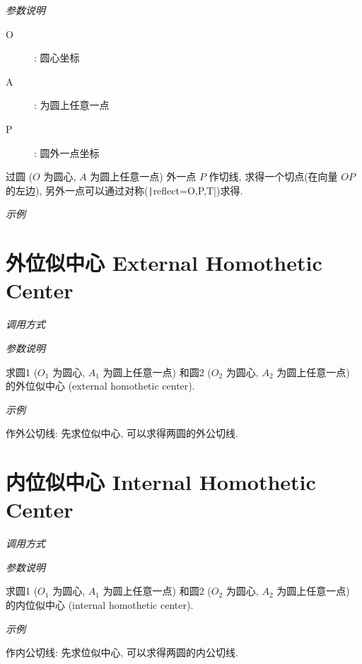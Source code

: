 \emph{参数说明}

\begin{description}
  \item[O]: 圆心坐标
  \item[A]: 为圆上任意一点
  \item[P]: 圆外一点坐标
\end{description}

过圆 ($O$ 为圆心, $A$ 为圆上任意一点) 外一点 $P$ 作切线, 求得一个切点(在向量 $OP$ 的左边),
另外一点可以通过对称(\texttt|reflect={O,P,T}|)求得.

\emph{示例}


\section{外位似中心 External Homothetic Center}

\emph{调用方式}

\begin{tcolorbox}{}
\end{tcolorbox}

\emph{参数说明}

求圆1 ($O_1$ 为圆心, $A_1$ 为圆上任意一点)
和圆2 ($O_2$ 为圆心, $A_2$ 为圆上任意一点) 
的外位似中心 (external homothetic center)\cite{HOMO}.

\emph{示例}

作外公切线: 先求位似中心, 可以求得两圆的外公切线.


\section{内位似中心 Internal Homothetic Center}

\emph{调用方式}

\begin{tcolorbox}{}
\end{tcolorbox}

\emph{参数说明}

求圆1 ($O_1$ 为圆心, $A_1$ 为圆上任意一点)
和圆2 ($O_2$ 为圆心, $A_2$ 为圆上任意一点) 
的内位似中心 (internal homothetic center)\cite{HOMO}.

\emph{示例}

作内公切线: 先求位似中心, 可以求得两圆的内公切线.

